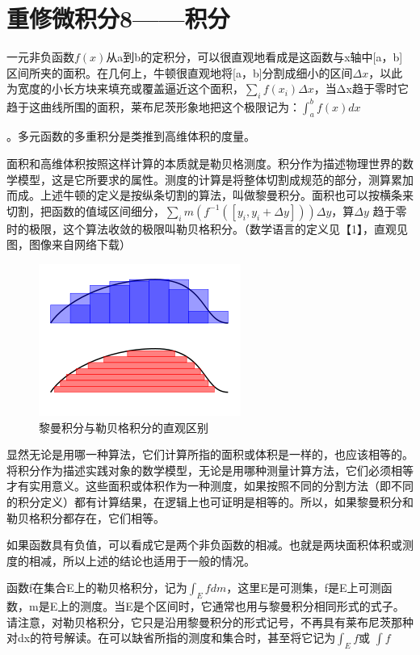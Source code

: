 \chapter{重修微积分8——积分}

一元非负函数$ f(x) $从a到b的定积分，可以很直观地看成是这函数与x轴中[a，b]区间所夹的面积。在几何上，牛顿很直观地将[a，b]分割成细小的区间$ \Delta x $，以此为宽度的小长方块来填充或覆盖逼近这个面积，$ \sum_{i}f(x_i)\Delta x $，当Δx趋于零时它趋于这曲线所围的面积，莱布尼茨形象地把这个极限记为：$ \int_{a}^{b} f(x)dx $

。多元函数的多重积分是类推到高维体积的度量。

面积和高维体积按照这样计算的本质就是勒贝格测度。积分作为描述物理世界的数学模型，这是它所要求的属性。测度的计算是将整体切割成规范的部分，测算累加而成。上述牛顿的定义是按纵条切割的算法，叫做黎曼积分。面积也可以按横条来切割，把函数的值域区间细分，$ \sum _i  m(f^{-1}([y_i, y_i+\Delta y])) \Delta y $，算$ \Delta y $ 趋于零时的极限，这个算法收敛的极限叫勒贝格积分。（数学语言的定义见【1】，直观见图，图像来自网络下载）
\begin{figure}[h]
	\centering
	\includegraphics[width=0.7\linewidth]{pic/130332sliyik6hvp1iki1d.png}
	\caption{黎曼积分与勒贝格积分的直观区别}
	\label{fig:130332sliyik6hvp1iki1d}
\end{figure}

显然无论是用哪一种算法，它们计算所指的面积或体积是一样的，也应该相等的。将积分作为描述实践对象的数学模型，无论是用哪种测量计算方法，它们必须相等才有实用意义。这些面积或体积作为一种测度，如果按照不同的分割方法（即不同的积分定义）都有计算结果，在逻辑上也可证明是相等的。所以，如果黎曼积分和勒贝格积分都存在，它们相等。

如果函数具有负值，可以看成它是两个非负函数的相减。也就是两块面积体积或测度的相减，所以上述的结论也适用于一般的情况。

函数f在集合E上的勒贝格积分，记为$ \int_E f d m $，这里E是可测集，f是E上可测函数，m是E上的测度。当E是个区间时，它通常也用与黎曼积分相同形式的式子。请注意，对勒贝格积分，它只是沿用黎曼积分的形式记号，不再具有莱布尼茨那种对dx的符号解读。在可以缺省所指的测度和集合时，甚至将它记为$ \int_E f $或 $ \int f  $

